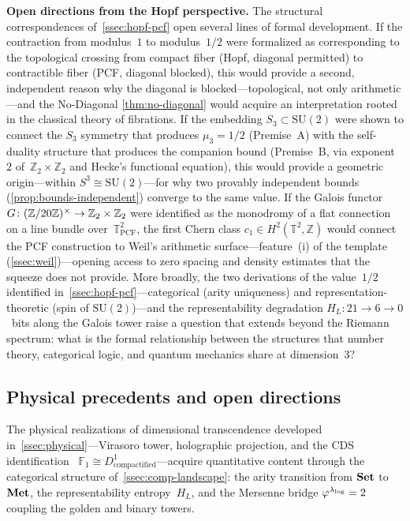\smallskip\noindent\textbf{Open directions from the Hopf perspective.}
The structural correspondences of~\cref{ssec:hopf-pcf} open several
lines of formal development.
%
If the contraction from modulus~$1$ to modulus~$1/2$ were formalized
as corresponding to the topological crossing from compact fiber
(Hopf, diagonal permitted) to contractible fiber (PCF, diagonal
blocked), this would provide a second, independent reason why the
diagonal is blocked---topological, not only arithmetic---and the
No-Diagonal \cref{thm:no-diagonal} would acquire an
interpretation rooted in the classical theory of fibrations.
%
If the embedding $S_3\subset\mathrm{SU}(2)$ were shown to connect the
$S_3$ symmetry that produces $\mu_3=1/2$ (Premise~A) with the
self-duality structure that produces the companion bound (Premise~B,
via exponent~$2$ of~$\mathbb{Z}_2\times\mathbb{Z}_2$ and Hecke's
functional equation), this would provide a geometric origin---within
$S^3\cong\mathrm{SU}(2)$---for why two provably independent bounds
(\cref{prop:bounds-independent}) converge to the same value.
%
If the Galois functor
$G\colon(\mathbb{Z}/20\mathbb{Z})^\times\to\mathbb{Z}_2\times\mathbb{Z}_2$ were identified
as the monodromy of a flat connection on a line bundle
over~$\mathbb{T}^2_{\mathrm{PCF}}$, the first Chern class
$c_1\in H^2(\mathbb{T}^2,\mathbb{Z})$ would connect the PCF
construction to Weil's arithmetic surface---feature~(i) of the
template (\cref{ssec:weil})---opening access to zero spacing and
density estimates that the squeeze does not provide.
%
More broadly, the two derivations of the value~$1/2$ identified
in~\cref{ssec:hopf-pcf}---categorical (arity uniqueness) and
representation-theoretic (spin of $\mathrm{SU}(2)$)---and the
representability degradation $H_L\colon 21\to 6\to 0$~bits along
the Galois tower raise a question that extends beyond the Riemann
spectrum: what is the formal relationship between the structures that
number theory, categorical logic, and quantum mechanics share at
dimension~$3$?


\subsection{Physical precedents and open
directions}\label{ssec:phys-landscape}

The physical realizations of dimensional transcendence developed
in~\cref{ssec:physical}---Virasoro tower, holographic projection, and
the CDS identification~\cite{connes98,witten95}
$\mathbb{F}_1\cong D^1_{\text{compactified}}$---acquire quantitative
content through the categorical structure
of~\cref{ssec:comp-landscape}: the arity transition from $\mathbf{Set}$
to~$\mathbf{Met}$, the representability entropy~$H_L$, and the Mersenne bridge
$\varphi^{\lambda_{\log}}=2$ coupling the golden and binary towers.

